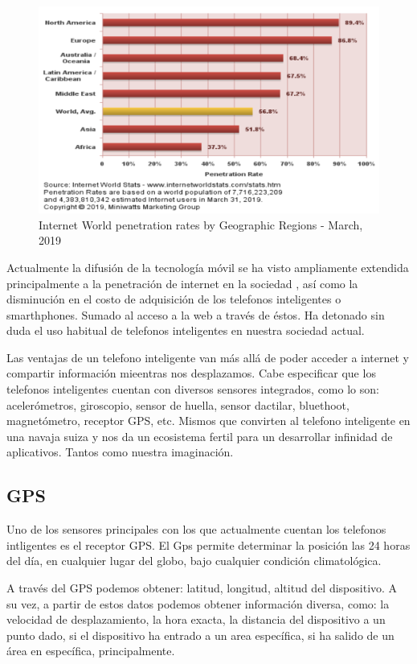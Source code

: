 \begin{figure}[bp!]
	\centering
	\includegraphics[width=5in]{imgs/internetPenetration19}
	  \caption{Internet World penetration rates by Geographic Regions - March, 2019}
\end{figure}

Actualmente la difusión de la tecnología móvil se ha visto ampliamente extendida principalmente a la penetración de internet en la sociedad \cite{internetPenetration}, así como la disminución en el costo de adquisición de los telefonos inteligentes o smarthphones. Sumado al acceso a la web a través de éstos. Ha detonado sin duda el uso habitual de telefonos inteligentes en nuestra sociedad actual.

Las ventajas de un telefono inteligente van más allá de poder acceder a internet y compartir información mieentras nos desplazamos. Cabe especificar que los telefonos inteligentes cuentan con diversos sensores integrados, como lo son: acelerómetros, giroscopio, sensor de huella, sensor dactilar, bluethoot, magnetómetro, receptor GPS, etc. Mismos que convirten al telefono inteligente en una navaja suiza y nos da un ecosistema fertil para un desarrollar infinidad de aplicativos. Tantos como nuestra imaginación.


\subsection{GPS}

Uno de los sensores principales con los que actualmente cuentan los telefonos intligentes es el receptor GPS. El Gps permite determinar la posición las 24 horas del día, en cualquier lugar del globo, bajo cualquier condición climatológica.\cite{latham}

A través del GPS podemos obtener: latitud, longitud, altitud del dispositivo. A su vez, a partir de estos datos podemos obtener información diversa, como: la velocidad de desplazamiento, la hora exacta, la distancia del dispositivo a un punto dado, si el dispositivo ha entrado a un area específica, si ha salido de un área en específica, principalmente.

